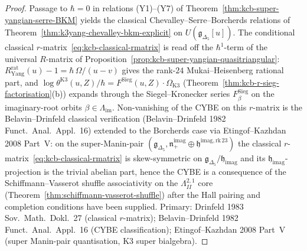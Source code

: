 \begin{proof}
Passage to $\hbar=0$ in relations (Y1)--(Y7) of
Theorem~\ref{thm:kcb-super-yangian-serre-BKM} yields the classical
Chevalley--Serre--Borcherds relations of
Theorem~\ref{thm:k3yang-chevalley-bkm-explicit} on
$U(\mathfrak{g}_{\Delta_5}[u])$. The conditional classical
$r$-matrix~\eqref{eq:kcb-classical-rmatrix} is read off the
$\hbar^1$-term of the universal $R$-matrix
of Proposition~\ref{prop:kcb-super-yangian-quasitriangular}:
$R^{\mathrm{rat}}_{\mathrm{Yang}}(u)-1 = \hbar\,\Omega/(u-v)$ gives
the rank-$24$ Mukai--Heisenberg rational part, and
$\log\theta^{\mathrm{K3}}(u,Z)/\hbar =
F^{\mathrm{Sieg}}(u,Z)\cdot\Omega_{\mathrm{K3}}$
(Theorem~\ref{thm:kcb-r-sieg-factorisation}(b)) expands through the
Siegel--Kronecker series $F^{\mathrm{Sieg}}_\beta$ on the
imaginary-root orbits $\beta\in\Lambda_{\mathrm{im}}$.
Non-vanishing of the CYBE on this $r$-matrix is the Belavin--Drinfeld
classical verification (Belavin--Drinfeld 1982 \textup{Funct.~Anal.~Appl.}~16)
extended to the Borcherds case via Etingof--Kazhdan 2008 Part~V: on
the super-Manin-pair $(\mathfrak{g}_{\Delta_5},\mathfrak{n}_+^{\mathrm{imag}}
\oplus\mathfrak{h}^{\mathrm{imag,rk\,23}})$ the classical
$r$-matrix~\eqref{eq:kcb-classical-rmatrix} is
skew-symmetric on $\mathfrak{g}_{\Delta_5}/\mathfrak{h}_{\mathrm{imag}}$
and its $\mathfrak{h}_{\mathrm{imag}}$-projection is the trivial
abelian part, hence the CYBE is a consequence of the
Schiffmann--Vasserot shuffle associativity on the $\Lambda^{2,1}_{II}$
core
(Theorem~\ref{thm:schiffmann-vasserot-shuffle}) after the Hall
pairing and completion conditions have been supplied.
Primary: Drinfeld 1983 \textup{Sov.~Math.~Dokl.}~27 (classical
$r$-matrix); Belavin--Drinfeld 1982 \textup{Funct.~Anal.~Appl.}~16
(CYBE classification); Etingof--Kazhdan 2008 Part~V (super
Manin-pair quantisation, K3 super bialgebra).
\end{proof}

